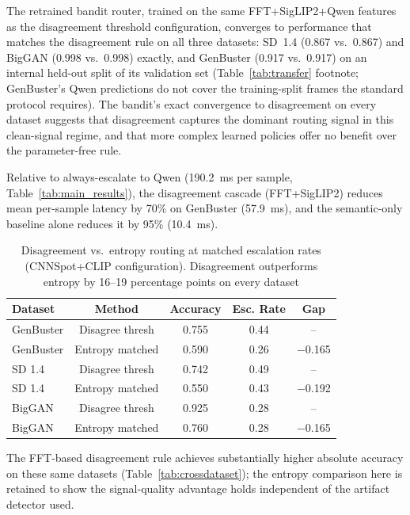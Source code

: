 \documentclass{ieeeaccess}
\begin{document}
The retrained bandit router, trained on the same FFT+SigLIP2+Qwen features as the disagreement threshold configuration, converges to performance that matches the disagreement rule on all three datasets: SD~1.4 (0.867 vs.\ 0.867) and BigGAN (0.998 vs.\ 0.998) exactly, and GenBuster (0.917 vs.\ 0.917) on an internal held-out split of its validation set (Table~\ref{tab:transfer} footnote; GenBuster's Qwen predictions do not cover the training-split frames the standard protocol requires). The bandit's exact convergence to disagreement on every dataset suggests that disagreement captures the dominant routing signal in this clean-signal regime, and that more complex learned policies offer no benefit over the parameter-free rule.


Relative to always-escalate to Qwen (190.2~ms per sample, Table~\ref{tab:main_results}),
the disagreement cascade (FFT+SigLIP2) reduces mean per-sample latency by 70\% on
GenBuster (57.9~ms), and the semantic-only baseline alone reduces it by 95\% (10.4~ms).


\begin{table}[h]
\centering
\caption{Disagreement vs.\ entropy routing at matched escalation rates (CNNSpot+CLIP
configuration). Disagreement outperforms entropy by 16--19 percentage points on every
dataset}
\label{tab:matched_entropy}
\begin{tabular}{lcccc}
\toprule
Dataset & Method & Accuracy & Esc. Rate & Gap \\
\midrule
GenBuster & Disagree thresh      & 0.755 & 0.44 & --     \\
GenBuster & Entropy matched      & 0.590 & 0.26 & $-$0.165 \\
\midrule
SD 1.4    & Disagree thresh      & 0.742 & 0.49 & --     \\
SD 1.4    & Entropy matched      & 0.550 & 0.43 & $-$0.192 \\
\midrule
BigGAN    & Disagree thresh      & 0.925 & 0.28 & --     \\
BigGAN    & Entropy matched      & 0.760 & 0.28 & $-$0.165 \\
\bottomrule
\end{tabular}
The FFT-based disagreement rule achieves substantially higher absolute accuracy on
these same datasets (Table~\ref{tab:crossdataset}); the entropy comparison here is
retained to show the signal-quality advantage holds independent of the artifact
detector used.
\end{table}
\end{document}

